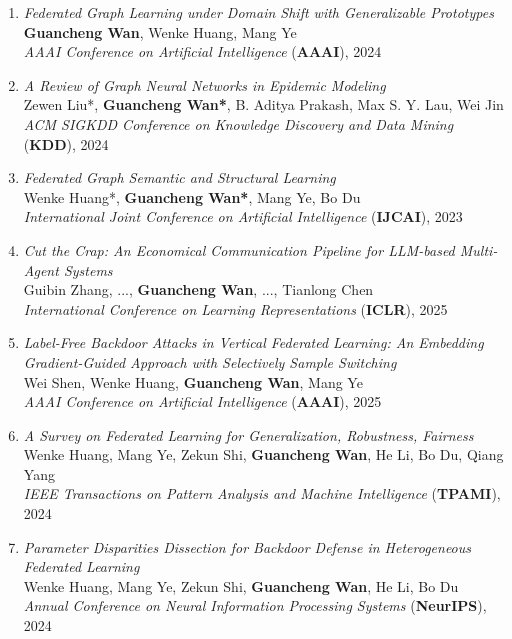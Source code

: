 \begin{enumerate}
    \item \textit{Federated Graph Learning under Domain Shift with Generalizable Prototypes} \\
    \textbf{Guancheng Wan}, Wenke Huang, Mang Ye \\
    \hfill \textit{AAAI Conference on Artificial Intelligence} (\textbf{AAAI}), 2024

    \item \textit{A Review of Graph Neural Networks in Epidemic Modeling} \\
    Zewen Liu*,\textbf{ Guancheng Wan*}, B. Aditya Prakash, Max S. Y. Lau, Wei Jin \\
    \hfill \textit{ACM SIGKDD Conference on Knowledge Discovery and Data Mining} (\textbf{KDD}), 2024

    \item \textit{Federated Graph Semantic and Structural Learning} \\
    Wenke Huang*,\textbf{ Guancheng Wan*}, Mang Ye, Bo Du \\
    \hfill \textit{International Joint Conference on Artificial Intelligence} (\textbf{IJCAI}), 2023

    \item \textit{Cut the Crap: An Economical Communication Pipeline for LLM-based Multi-Agent Systems} \\
    Guibin Zhang, ..., \textbf{Guancheng Wan}, ..., Tianlong Chen \\
    \hfill \textit{International Conference on Learning Representations} (\textbf{ICLR}), 2025

    \item \textit{Label-Free Backdoor Attacks in Vertical Federated Learning: An Embedding Gradient-Guided Approach with Selectively Sample Switching} \\
    Wei Shen, Wenke Huang, \textbf{Guancheng Wan}, Mang Ye \\
    \hfill \textit{AAAI Conference on Artificial Intelligence} (\textbf{AAAI}), 2025

    \item \textit{A Survey on Federated Learning for Generalization, Robustness, Fairness} \\
    Wenke Huang, Mang Ye, Zekun Shi, \textbf{Guancheng Wan}, He Li, Bo Du, Qiang Yang \\
    \hfill \textit{IEEE Transactions on Pattern Analysis and Machine Intelligence} (\textbf{TPAMI}), 2024

    \item \textit{Parameter Disparities Dissection for Backdoor Defense in Heterogeneous Federated Learning} \\
    Wenke Huang, Mang Ye, Zekun Shi, \textbf{Guancheng Wan}, He Li, Bo Du \\
    \hfill \textit{Annual Conference on Neural Information Processing Systems} (\textbf{NeurIPS}), 2024
\end{enumerate}